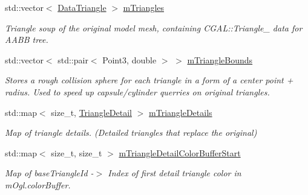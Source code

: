 \begin{DoxyCompactItemize}
\item 
\mbox{\label{classpepr3d_1_1_geometry_ae72aa9945025d6609ef0fe5beab238f9}} 
std\+::vector$<$ \mbox{\hyperlink{classpepr3d_1_1_data_triangle}{Data\+Triangle}} $>$ \mbox{\hyperlink{classpepr3d_1_1_geometry_ae72aa9945025d6609ef0fe5beab238f9}{m\+Triangles}}
\begin{DoxyCompactList}\small\item\em Triangle soup of the original model mesh, containing C\+G\+A\+L\+::\+Triangle\+\_ data for A\+A\+BB tree. \end{DoxyCompactList}\item 
\mbox{\label{classpepr3d_1_1_geometry_a2ab785869db636d7dc75d192cbd34c30}} 
std\+::vector$<$ std\+::pair$<$ Point3, double $>$ $>$ \mbox{\hyperlink{classpepr3d_1_1_geometry_a2ab785869db636d7dc75d192cbd34c30}{m\+Triangle\+Bounds}}
\begin{DoxyCompactList}\small\item\em Stores a rough collision sphere for each triangle in a form of a center point + radius. Used to speed up capsule/cylinder querries on original triangles. \end{DoxyCompactList}\item 
\mbox{\label{classpepr3d_1_1_geometry_a899b65a3e64dc086f6275e4a5b616b62}} 
std\+::map$<$ size\+\_\+t, \mbox{\hyperlink{classpepr3d_1_1_triangle_detail}{Triangle\+Detail}} $>$ \mbox{\hyperlink{classpepr3d_1_1_geometry_a899b65a3e64dc086f6275e4a5b616b62}{m\+Triangle\+Details}}
\begin{DoxyCompactList}\small\item\em Map of triangle details. (Detailed triangles that replace the original) \end{DoxyCompactList}\item 
\mbox{\label{classpepr3d_1_1_geometry_aee03bb37cbf326e4594b58edacbc17c0}} 
std\+::map$<$ size\+\_\+t, size\+\_\+t $>$ \mbox{\hyperlink{classpepr3d_1_1_geometry_aee03bb37cbf326e4594b58edacbc17c0}{m\+Triangle\+Detail\+Color\+Buffer\+Start}}
\begin{DoxyCompactList}\small\item\em Map of base\+Triangle\+Id -\/$>$ Index of first detail triangle color in m\+Ogl.\+color\+Buffer. \end{DoxyCompactList}\item 

\end{DoxyCompactItemize}
